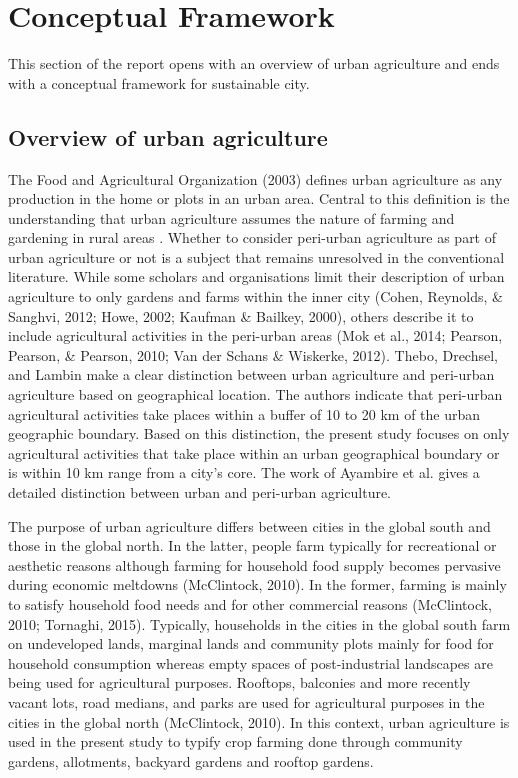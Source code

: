\chapter{Conceptual Framework} %

\label{Chapter:ConceptualFramework}

This section of the report opens with an overview of urban agriculture and ends with a conceptual framework for sustainable city.

\section{Overview of urban agriculture}

The Food and Agricultural Organization (2003) defines urban agriculture as any production in the home or plots in an urban area. Central to this definition is the understanding that urban agriculture assumes the nature of farming and gardening in rural areas \cite{Opitz2016}. Whether to consider peri-urban agriculture as part of urban agriculture or not is a subject that remains unresolved in the conventional literature. While some scholars and organisations limit their description of urban agriculture to only gardens and farms within the inner city (Cohen, Reynolds, \& Sanghvi, 2012; Howe, 2002; Kaufman \& Bailkey, 2000), others describe it to include agricultural activities in the peri-urban areas (Mok et al., 2014; Pearson, Pearson, \& Pearson, 2010; Van der Schans \& Wiskerke, 2012). Thebo, Drechsel, and Lambin \cite{Thebo2014} make a clear distinction between urban agriculture and peri-urban agriculture based on geographical location. The authors indicate that peri-urban agricultural activities take places within a buffer of 10 to 20 km of the urban geographic boundary. Based on this distinction, the present study focuses on only agricultural activities that take place within an urban geographical boundary or is within 10 km range from a city's core. The work of Ayambire et al. \cite{Ayambire2019} gives a detailed distinction between urban and peri-urban agriculture.

The purpose of urban agriculture differs between cities in the global south and those in the global north. In the latter, people farm typically for recreational or aesthetic reasons although farming for household food supply becomes pervasive during economic meltdowns (McClintock, 2010). In the former, farming is mainly to satisfy household food needs and for other commercial reasons \cite{Amponsah2016} (McClintock, 2010; Tornaghi, 2015). Typically, households in the cities in the global south farm on undeveloped lands, marginal lands and community plots mainly for food for household consumption whereas empty spaces of post-industrial landscapes are being used for agricultural purposes. Rooftops, balconies and more recently vacant lots, road medians, and parks are used for agricultural purposes in the cities in the global north (McClintock, 2010). In this context, urban agriculture is used in the present study to typify crop farming done through community gardens, allotments, backyard gardens and rooftop gardens.

